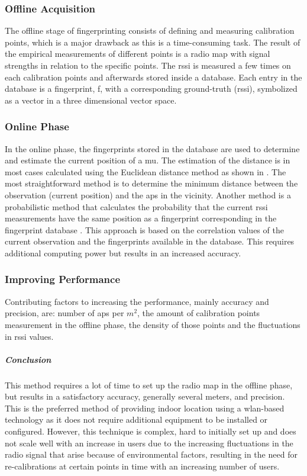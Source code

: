 \subsubsection{Offline Acquisition}
The offline stage of fingerprinting consists of defining and measuring calibration points, which is a major drawback as this is a time-consuming task. The result of the empirical measurements of different points is a radio map with signal strengths in relation to the specific points. The \acrshort{rssi} is measured a few times on each calibration points and afterwards stored inside a database. Each entry in the database is a fingerprint, f, with a corresponding ground-truth (\acrshort{rssi}), symbolized as a vector in a three dimensional vector space.
\subsubsection{Online Phase}
In the online phase, the fingerprints stored in the database are used to determine and estimate the current position of a \acrshort{mu}. The estimation of the distance is in most cases calculated using the Euclidean distance method as shown in \cite{fig:euclidean}. The most straightforward method is to determine the minimum distance between the observation (current position) and the \acrshort{ap}s in the vicinity. Another method is a probabilistic method that calculates the probability that the current \acrlong{rssi} measurements have the same position as a fingerprint corresponding in the fingerprint database \cite{Mautz}. This approach is based on the correlation values of the current observation and the fingerprints available in the database. This requires additional computing power but results in an increased accuracy.
\subsubsection{Improving Performance}
Contributing factors to increasing the performance, mainly accuracy and precision, are: number of \acrshort{ap}s per $m^2$, the amount of calibration points measurement in the offline phase, the density of those points and the fluctuations in  \acrshort{rssi} values.
\subparagraph{Conclusion}
This method requires a lot of time to set up the radio map in the offline phase, but results in a satisfactory accuracy, generally several meters, and precision. This is the preferred method of providing indoor location using a \acrshort{wlan}-based technology as it does not require additional equipment to be installed or configured. However, this technique is complex, hard to initially set up and does not scale well with an increase in users due to the increasing fluctuations in the radio signal that arise because of environmental factors, resulting in the need for re-calibrations at certain points in time with an increasing number of users.
